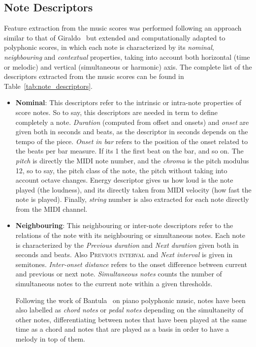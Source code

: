 \subsection{Note Descriptors}
\label{sec:notedescriptors}
Feature extraction from the music scores was performed following an approach similar to that of Giraldo~\cite{Giraldo2016} but extended and computationally adapted to polyphonic scores, in which each note is characterized by its \textit{nominal}, \textit{neighbouring} and \textit{contextual} properties, taking into account both horizontal (time or melodic) and vertical (simultaneous or harmonic) axis. The complete list of the descriptors extracted from the music scores can be found in Table~\ref{tab:note_descriptors}.



\begin{itemize}
\item \textbf{Nominal}: This descriptors refer to the intrinsic or intra-note properties of score notes. So to say, this descriptors are needed in term to define completely a note. \textit{Duration} (computed from offset and onsets) and \textit{onset} are given both in seconds and beats, as the descriptor in seconds depends on the tempo of the piece. \textit{Onset in bar} refers to the position of the onset related to the beats per bar measure. If its 1 the first beat on the bar, and so on. The \textit{pitch} is directly the MIDI note number, and the \textit{chroma} is the pitch modulus 12, so to say, the pitch class of the note, the pitch without taking into account octave changes. Energy descriptor gives us how loud is the note played (the loudness), and its directly taken from MIDI velocity (how fast the note is played). Finally, \textit{string} number is also extracted for each note directly from the MIDI channel.

\item \textbf{Neighbouring}: This neighbouring or inter-note descriptors refer to the relations of the note with its neighbouring or simultaneous notes. Each note is characterized by the \textit{Previous duration} and \textit{Next duration} given both in seconds and beats. Also \textsc{Previous interval} and \textit{Next interval} is given in semitones. \textit{Inter-onset distance} refers to the onset difference between current and previous or next note. \textit{Simultaneous notes} counts the number of simultaneous notes to the current note within a given thresholds.

Following the work of Bantula~\cite{bantula2016} on piano polyphonic music, notes have been also labelled as \textit{chord notes} or \textit{pedal notes} depending on the simultaneity of other notes, differentiating between notes that have been played at the same time as a chord and notes that are played as a basis in order to have a melody in top of them.


\end{itemize}
